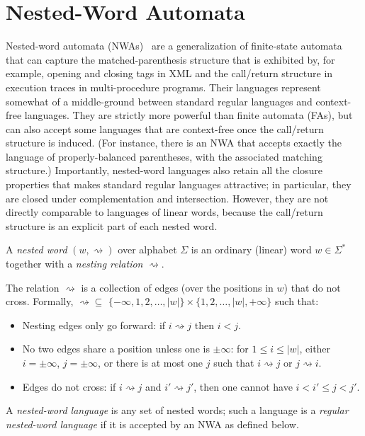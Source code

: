 \section{Nested-Word Automata}
\label{App:nwa-definition}

Nested-word automata (NWAs)~\cite{DLT:AM2006,JACM:AM2009} are a generalization
of finite-state automata that can capture the matched-parenthesis structure
that is exhibited by, for example, opening and closing tags in XML and the
call/return structure in execution traces in multi-procedure
programs. Their languages represent somewhat of a middle-ground between
standard regular languages and context-free languages. They are strictly more
powerful than finite automata (FAs), but can also accept some languages that
are context-free once the call/return structure is induced. (For instance,
there is an NWA that
accepts exactly the language of properly-balanced parentheses, with the
associated matching structure.) Importantly, nested-word languages also retain all the closure
properties that makes standard regular languages attractive; in particular,
they are closed under complementation and intersection. However, they are not
directly comparable to languages of linear words, because the call/return
structure is an explicit part of each nested word.

\begin{definition}
  A \textsl{nested word} $(w,\rightsquigarrow)$ over alphabet $\Sigma$ is an
  ordinary (linear) word $w \in \Sigma^*$ together with a
  \textsl{nesting relation} $\rightsquigarrow$.

  The relation $\rightsquigarrow$ is a collection of edges (over the
  positions in $w$) that do not cross. Formally, $\rightsquigarrow \subseteq$
  $\{-\infty, 1, 2, \ldots, |w| \} \times \{1, 2, \ldots, |w|, +\infty\}$
  such that:
  \begin{itemize}
    \item
      Nesting edges only go forward: if $i \rightsquigarrow j$ then $i < j$.
    \item
      No two edges share a position unless one is $\pm\infty$: for $1
      \leq i \leq |w|$, either $i=\pm\infty$, $j=\pm\infty$, or
      there is at
      most one $j$ such that $i \rightsquigarrow j$ or $j \rightsquigarrow
      i$.
    \item
      Edges do not cross: if $i \rightsquigarrow j$ and $i' \rightsquigarrow
      j'$, then one cannot have $i < i' \leq j < j'$.
  \end{itemize}

  A \textsl{nested-word language} is any set of nested words; such a language
  is a \textsl{regular nested-word language} if it is accepted by an NWA as
  defined below.
\end{definition}

